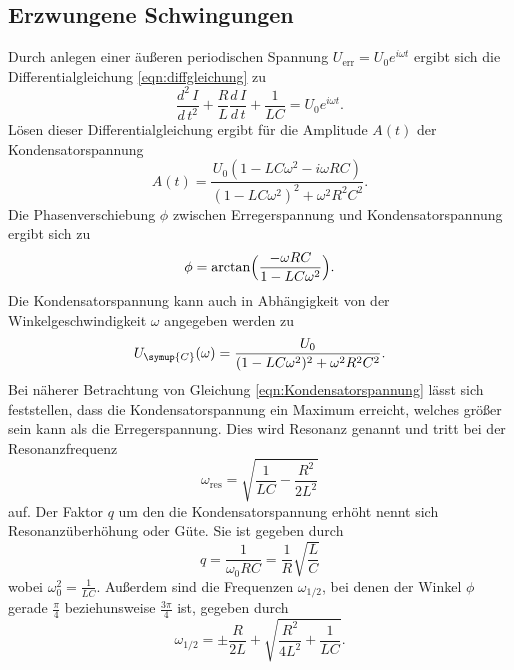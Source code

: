     \subsection{Erzwungene Schwingungen}        
        Durch anlegen einer äußeren periodischen Spannung $U_\text{err} = U_0 e^{i \omega t }$ ergibt sich die Differentialgleichung \eqref{eqn:diffgleichung}
        zu
        \begin{equation}
            \label{eqn:diffgleichung2}
            \frac{d^2 \, I}{d \, t^2} + \frac{R}{L} \frac{d \, I}{d \, t} + \frac {1}{L C} = U_0 e^{i \omega t}.
        \end{equation}    
        Lösen dieser Differentialgleichung ergibt für die Amplitude $A(t)$ der Kondensatorspannung
        \begin{equation}
            \label{eqn:amplitude}
            A(t) = \frac{U_0 (1 - L C \omega^2 - i \omega R C)}{(1 - L C \omega^2)^2 + \omega^2 R^2 C^2}.
        \end{equation}
        Die Phasenverschiebung $\phi$ zwischen Erregerspannung und Kondensatorspannung ergibt sich zu
        \begin{equation}
            \label{eqn:phasenverschiebung}
            \phi = \arctan \Bigl( \frac {- \omega R C} {1 - L C \omega^2} \Bigr).
        \end{equation}
        Die Kondensatorspannung kann auch in Abhängigkeit von der Winkelgeschwindigkeit $\omega$ angegeben werden zu
        \begin{equation}
            \label{eqn:Kondensatorspannung}
            U_{\symup{C}}(\omega) = \frac {U_0} {(1 - L C \omega^2)^2 + \omega^2 R^2 C^2}.
        \end{equation}
        Bei näherer Betrachtung von Gleichung \eqref{eqn:Kondensatorspannung} lässt sich feststellen, dass die Kondensatorspannung
        ein Maximum erreicht, welches größer sein kann als die Erregerspannung. Dies wird Resonanz genannt und tritt bei der Resonanzfrequenz
        \begin{equation}
            \label{eqn:Resonanzfrequenz}
            \omega_\text{res} = \sqrt{\frac{1}{L C} - \frac{R^2}{2 L^2}}
        \end{equation}
        auf. Der Faktor $q$ um den die Kondensatorspannung erhöht nennt sich Resonanzüberhöhung oder Güte. 
        Sie ist gegeben durch 
        \begin{equation} 
            \label{eqn:güte}
            q = \frac{1}{\omega_0 R C} = \frac{1}{R} \sqrt{\frac{L}{C}}
        \end{equation}
        wobei $\omega_0^2 = \frac{1}{L C}$.   
       Außerdem sind die Frequenzen $\omega_\text{$1/2$}$, bei denen
        der Winkel $\phi$ gerade $\frac{\pi}{4}$ beziehunsweise $\frac{3 \pi}{4}$ ist, gegeben durch
        \begin{equation}
            \label{eqn:omega12}
            \omega_\text{$1/2$} = \pm \frac{R}{2 L} + \sqrt{\frac{R^2}{4 L^2} + \frac{1}{L C} }.
        \end{equation}    